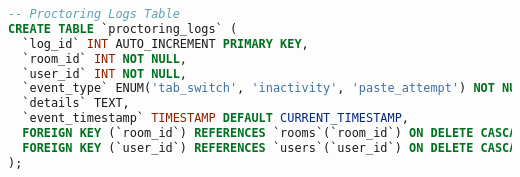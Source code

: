 \begin{lstlisting}[language=SQL, caption={Full Database SQL Schema for TEKUTOKO}]
-- Proctoring Logs Table
CREATE TABLE `proctoring_logs` (
  `log_id` INT AUTO_INCREMENT PRIMARY KEY,
  `room_id` INT NOT NULL,
  `user_id` INT NOT NULL,
  `event_type` ENUM('tab_switch', 'inactivity', 'paste_attempt') NOT NULL,
  `details` TEXT,
  `event_timestamp` TIMESTAMP DEFAULT CURRENT_TIMESTAMP,
  FOREIGN KEY (`room_id`) REFERENCES `rooms`(`room_id`) ON DELETE CASCADE,
  FOREIGN KEY (`user_id`) REFERENCES `users`(`user_id`) ON DELETE CASCADE
);
\end{lstlisting}
